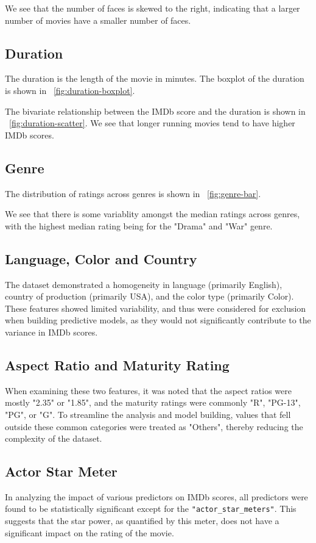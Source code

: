 \documentclass[12pt,a4paper]{article}
\begin{document}
We see that the number of faces is skewed to the right, indicating that a larger number of movies have a smaller number of faces.

\subsection{Duration}\label{subsec:duration}
The duration is the length of the movie in minutes.
The boxplot of the duration is shown in \figurename~\ref{fig:duration-boxplot}.

The bivariate relationship between the IMDb score and the duration is shown in \figurename~\ref{fig:duration-scatter}.
We see that longer running movies tend to have higher IMDb scores.

\subsection{Genre}\label{subsec:genre}
The distribution of ratings across genres is shown in \figurename~\ref{fig:genre-bar}.

We see that there is some variablity amongst the median ratings across genres, with the highest median rating being for the "Drama" and "War" genre.

\subsection{Language, Color and Country}\label{subsec:language}
The dataset demonstrated a homogeneity in language (primarily English), country of production (primarily USA), and the color type (primarily Color).
These features showed limited variability, and thus were considered for exclusion when building predictive models, as they would not significantly contribute to the variance in IMDb scores.

\subsection{Aspect Ratio and Maturity Rating}\label{subsec:aspect-ratio}
When examining these two features, it was noted that the aspect ratios were mostly "2.35" or "1.85", and the maturity ratings were commonly "R", "PG-13", "PG", or "G".
To streamline the analysis and model building, values that fell outside these common categories were treated as "Others", thereby reducing the complexity of the dataset.

\subsection{Actor Star Meter}\label{subsec:star-meter}
In analyzing the impact of various predictors on IMDb scores, all predictors were found to be statistically significant except for the \texttt{"actor\_star\_meters"}.
This suggests that the star power, as quantified by this meter, does not have a significant impact on the rating of the movie.
\end{document}
